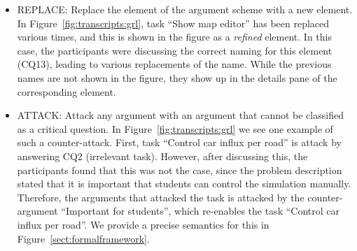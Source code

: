 \begin{itemize}
\item \textsf{REPLACE:} Replace the element of the argument scheme with a new element. In Figure~\ref{fig:transcripts:grl}, task ``Show map editor'' has been replaced various times, and this is shown in the figure as a \emph{refined} element. In this case, the participants were discussing the correct naming for this element (CQ13), leading to various replacements of the name. While the previous names are not shown in the figure, they show up in the details pane of the corresponding element.
\item \textsf{ATTACK:} Attack any argument with an argument that cannot be classified as a critical question. In Figure~\ref{fig:transcripts:grl} we see one example of such a counter-attack. First, task ``Control car influx per road'' is attack by answering CQ2 (irrelevant task). However, after discussing this, the participants found that this was not the case, since the problem description stated that it is important that students can control the simulation manually. Therefore, the arguments that attacked the task is attacked by the counter-argument ``Important for students'', which re-enables the task ``Control car influx per road''. We provide a precise semantics for this in Figure~\ref{sect:formalframework}.
\end{itemize}




